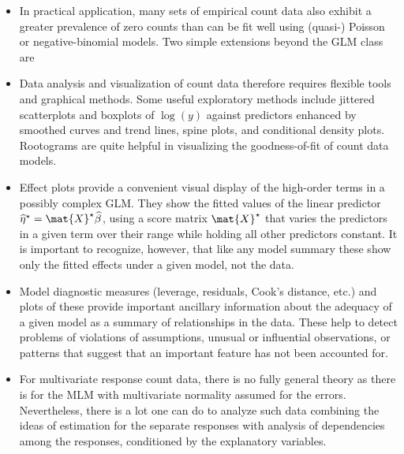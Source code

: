 \begin{itemize}
  \item In practical application, many sets of empirical count data also exhibit a greater prevalence of
  zero counts than can be fit well using (quasi-) Poisson or negative-binomial models.  Two simple
  extensions beyond the GLM class are

  \item Data analysis and visualization of count data therefore requires  flexible tools and graphical
  methods.  Some useful exploratory methods include jittered scatterplots and boxplots of $\log(y)$
  against predictors enhanced by smoothed curves and trend lines, spine plots, and conditional density plots.
  Rootograms are quite helpful in visualizing the goodness-of-fit of count data models.

  \item Effect plots provide a convenient visual display of the high-order terms in a possibly complex GLM.
  They show the fitted values of the linear predictor $\widehat{\eta}^\star = \mat{X}^\star \widehat{\beta}$,
  using a score matrix $\mat{X}^\star$ that varies the predictors in a given term over their range while holding
  all other predictors constant.  It is important to recognize, however, that like any model summary
  these show only the fitted
  effects under a given model, not the data.

  \item Model diagnostic measures (leverage, residuals, Cook's distance, etc.) and plots of these provide
  important ancillary information about the adequacy of a given model as a summary of relationships in the
  data.  These help to detect problems of violations of assumptions, unusual or influential observations,
  or patterns that suggest that an important feature has not been accounted for.

  \item For multivariate response count data, there is no fully general theory as there is for the
  MLM with multivariate normality assumed for the errors.
  Nevertheless, there is a lot one can do to analyze such data combining the ideas of estimation for
  the separate responses with analysis of dependencies among the responses, conditioned by the
  explanatory variables.


\end{itemize} 